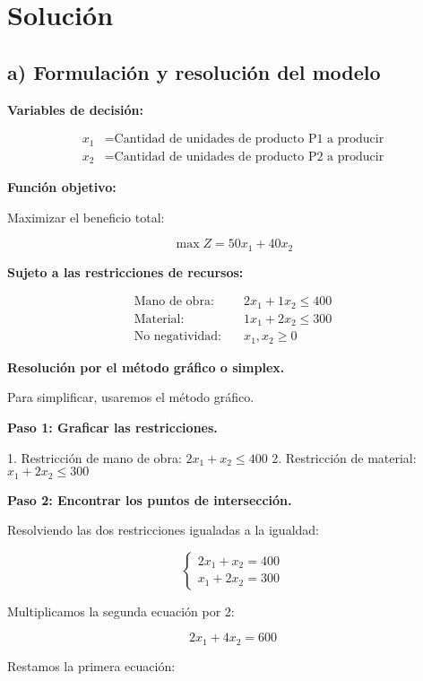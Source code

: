 \documentclass{article}
\begin{document}
\section*{Solución}

\subsection*{a) Formulación y resolución del modelo}

\textbf{Variables de decisión:}

\[
\begin{aligned}
x_1 &= \text{Cantidad de unidades de producto P1 a producir} \\
x_2 &= \text{Cantidad de unidades de producto P2 a producir}
\end{aligned}
\]

\textbf{Función objetivo:}

Maximizar el beneficio total:

\[
\max Z = 50x_1 + 40x_2
\]

\textbf{Sujeto a las restricciones de recursos:}

\[
\begin{aligned}
\text{Mano de obra:} & \quad 2x_1 + 1x_2 \leq 400 \\
\text{Material:} & \quad 1x_1 + 2x_2 \leq 300 \\
\text{No negatividad:} & \quad x_1, x_2 \geq 0
\end{aligned}
\]

\textbf{Resolución por el método gráfico o simplex.}

Para simplificar, usaremos el método gráfico.

\textbf{Paso 1: Graficar las restricciones.}

1. Restricción de mano de obra: \( 2x_1 + x_2 \leq 400 \)
2. Restricción de material: \( x_1 + 2x_2 \leq 300 \)

\textbf{Paso 2: Encontrar los puntos de intersección.}

Resolviendo las dos restricciones igualadas a la igualdad:

\[
\begin{cases}
2x_1 + x_2 = 400 \\
x_1 + 2x_2 = 300
\end{cases}
\]

Multiplicamos la segunda ecuación por 2:

\[
2x_1 + 4x_2 = 600
\]

Restamos la primera ecuación:
\end{document}
